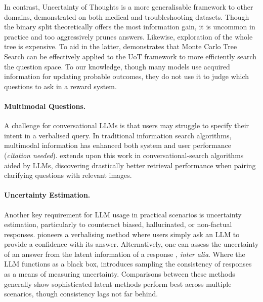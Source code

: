 \documentclass{article} %
\begin{document}
In contrast, Uncertainty of Thoughts \cite{uot} is a more generalisable framework to other domains, demonstrated on both medical and troubleshooting datasets. Though the binary split theoretically offers the most information gain, it is uncommon in practice and too aggressively prunes answers. Likewise, exploration of the whole tree is expensive. To aid in the latter, \cite{mcts} demonstrates that Monte Carlo Tree Search can be effectively applied to the UoT framework to more efficiently search the question space. %
To our knowledge, though many models use acquired information for updating probable outcomes, they do not use it to judge which questions to ask in a reward system.

\paragraph{Multimodal Questions.}
A challenge for conversational LLMs is that users may struggle to specify their intent in a verbalised query. In traditional information search algorithms, multimodal information has enhanced both system and user performance (\textit{citation needed}). \cite{yuan_multimodal} extends upon this work in conversational-search algorithms aided by LLMs, discovering drastically better retrieval performance when pairing clarifying questions with relevant images.

\paragraph{Uncertainty Estimation.}
Another key requirement for LLM usage in practical scenarios is uncertainty estimation, particularly to counteract biased, hallucinated, or non-factual responses. \cite{lin2022teaching} pioneers a verbalising method where users simply ask an LLM to provide a confidence with its answer. Alternatively, one can assess the uncertainty of an answer from the latent information of a response \cite{jiang-etal-2021-know,manakul-etal-2023-selfcheckgpt,kuhn2023semantic,cole-etal-2023-selectively}, \emph{inter alia}. Where the LLM functions as a black box, \cite{cole-etal-2023-selectively} introduces sampling the consistency of responses as a means of measuring uncertainty. Comparisons between these methods generally show sophisticated latent methods perform best across multiple scenarios, though consistency lags not far behind.
\end{document}
